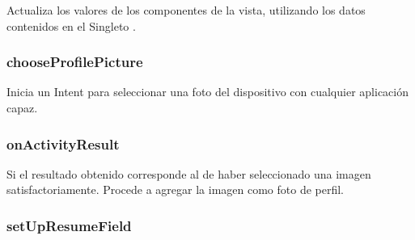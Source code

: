 \documentclass[letterpaper,10pt,english]{sphinxmanual}
\begin{document}
\begin{fulllineitems}
\label{Fragments/ProfileFragment:com.fiuba.tallerii.jobify.ProfileFragment.updateFields()}
Actualiza los valores de los componentes de la vista, utilizando los datos contenidos en el Singleto .

\end{fulllineitems}



\subsubsection{chooseProfilePicture}
\label{Fragments/ProfileFragment:chooseprofilepicture}

\begin{fulllineitems}
\label{Fragments/ProfileFragment:com.fiuba.tallerii.jobify.ProfileFragment.chooseProfilePicture()}
Inicia un Intent para seleccionar una foto del dispositivo con cualquier aplicación capaz.

\end{fulllineitems}



\subsubsection{onActivityResult}
\label{Fragments/ProfileFragment:onactivityresult}

\begin{fulllineitems}
\label{Fragments/ProfileFragment:com.fiuba.tallerii.jobify.ProfileFragment.onActivityResult(int, int, Intent)}
Si el resultado obtenido corresponde al de haber seleccionado una imagen satisfactoriamente. Procede a agregar la imagen como foto de perfil.

\end{fulllineitems}



\subsubsection{setUpResumeField}
\label{Fragments/ProfileFragment:setupresumefield}
\end{document}
